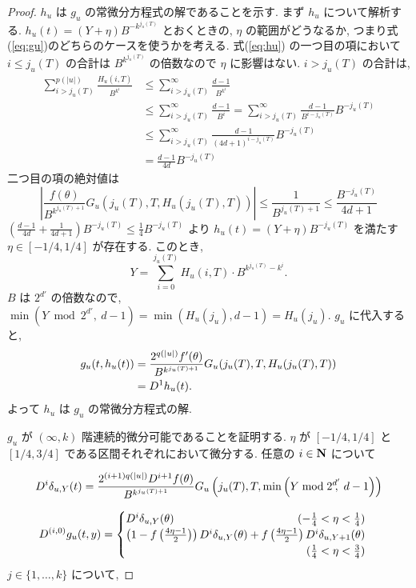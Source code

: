 \begin{proof}
 $h_u$ は $g_u$ の常微分方程式の解であることを示す.
 まず $h_u$ について解析する. 
  $h_u(t) = (Y + \eta) B^{-k^{j_u(T)}}$ とおくときの, $\eta$ の範囲がどうなるか,
  つまり式(\ref{eq:gu})のどちらのケースを使うかを考える.
  式(\ref{eq:hu}) の一つ目の項において
 $i \le j_u(T)$ の合計は $B^{k^{j_u(T)}}$ の倍数なので $\eta$ に影響はない.
  $i > j_u(T)$ の合計は, 
 \begin{align*}
  \sum_{i>j_u(T)}^{p(|u|)} \frac{H_u(i, T)}{B^{k^i}} 
  & \le \sum_{i>j_u(T)}^\infty \frac{d-1}{B^{k^i}}  \\
  & \le \sum_{i>j_u(T)}^\infty \frac{d-1}{B^i} 
   = \sum_{i>j_u(T)}^\infty \frac{d-1}{B^{i-j_u(T)}}B^{-j_u(T)} \\
  & \le \sum_{i>j_u(T)}^\infty \frac{d-1}{(4d+1)^{i-j_u(T)}}B^{-j_u(T)} \\
  & = \frac{d-1}{4d}B^{-j_u(T)}
 \end{align*}
 二つ目の項の絶対値は
 \begin{equation}
  \left| \frac{f(\theta)}{B^{k^{j_u(T)+1}}} G_u(j_u(T), T, H_u(j_u(T), T)) \right|
  \le \frac{1}{B^{j_u(T)+1}}
  \le \frac{B^{-j_u(T)}}{4d+1}
 \end{equation}
 $(\frac{d-1}{4d} + \frac{1}{4d+1})B^{-j_u(T)} \le \frac 1 4 B^{-j_u(T)} $
  より $h_u(t) = (Y + \eta) B^{-j_u(T)}$ を満たす $\eta \in [-1/4, 1/4]$
 が存在する. このとき,
 \begin{equation}
  Y = \sum_{i=0}^{j_u(T)}H_u(i, T) \cdot B^{k^{j_u(T)} - k^i} .
 \end{equation}
 $B$ は $2^{d'}$ の倍数なので, 
 $\min (Y \bmod 2^{d'}\!\!\!,\ d-1) = \min (H_u(j_u), d-1) = H_u(j_u)$. 
 $g_u$ に代入すると,
 \begin{align*}
   g_u(t, h_u(t)) 
  & =  \frac{2^{q(|u|)} f'(\theta)}{B^{k^{j_u(T)+1}}}
   G_u(j_u(T), T, H_u(j_u(T), T)) \\
  & =  D^{1}h_u(t).
 \end{align*}
 よって $h_u$ は $g_u$ の常微分方程式の解.

  $g_u$ が $(\infty, k)$ 階連続的微分可能であることを証明する.
  $\eta$ が $[-1/4, 1/4]$ と $[1/4, 3/4]$ である区間それぞれにおいて微分する.
  任意の $i \in \mathbf N$ について

  \begin{equation}
   D^i \delta_{u,Y}(t) 
    = \frac{2^{(i+1)q(|u|)} D^{i+1}f(\theta)}{B^{k^{j_u(T)+1}}}
    G_u\left( j_u(T), T, \min \left(Y \bmod 2^{d'}\!\!\!,\ d-1 \right) \right)
  \end{equation}

  \begin{equation}
   \label{eq:derivativeofgu}
    \D^{(i,0)} g_u(t, y)
     = \begin{cases}
 	\D^i \delta_{u, Y}(\theta) 
	\hfill (- \frac 1 4 < \eta < \frac 1 4) \\
	\left( 1-f \left(\frac{4\eta-1}{2}\right)\right) 
	\D^i \delta_{u, Y}(\theta) 
	+ f \left(\frac{4\eta-1}{2}\right) \D^i \delta_{u,Y+1}(\theta) \\
	\hfill (\frac 1 4 < \eta < \frac 3 4)
       \end{cases}
  \end{equation}   
  $j \in \{1, \dots , k\}$ について,


\end{proof}
